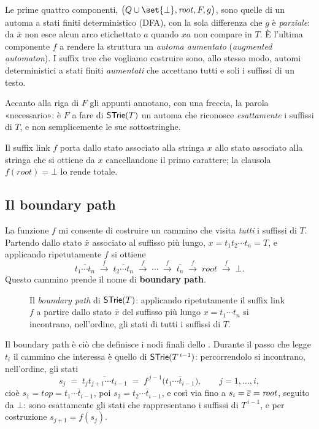 Le prime quattro componenti, $\bigl(Q\cup\set{\bot},\mathit{root},F,g\bigr)$, sono quelle di
un automa a stati finiti deterministico (DFA), con la sola differenza che $g$ è
\emph{parziale}: da $\bar{x}$ non esce alcun arco etichettato $a$ quando $xa$ non compare in
$T$. È l'ultima componente $f$ a rendere la struttura un \emph{automa aumentato}
(\emph{augmented automaton}). I suffix tree che
vogliamo costruire sono, allo stesso modo, automi deterministici a stati finiti
\emph{aumentati} che accettano tutti e soli i suffissi di un testo.

\begin{osservazione}
Accanto alla riga di $F$ gli appunti annotano, con una freccia, la parola «necessario»: è $F$
a fare di $\textsf{STrie}{}(T)$ un automa che riconosce \emph{esattamente} i suffissi di $T$, e non
semplicemente le sue sottostringhe.
\end{osservazione}

Il suffix link $f$ porta dallo stato associato alla stringa $x$ allo stato associato alla
stringa che si ottiene da $x$ cancellandone il primo carattere; la clausola
$f(\mathit{root}) = \bot$ lo rende totale.

\subsection{Il boundary path}

\begin{osservazione}
La funzione $f$ mi consente di costruire un cammino che visita \emph{tutti} i suffissi di
$T$. Partendo dallo stato $\bar{x}$ associato al suffisso più lungo, $x = t_1 t_2 \cdots t_n
= T$, e applicando ripetutamente $f$ si ottiene
\[
  \overline{t_1\cdots t_n}
  \;\xrightarrow{\ f\ }\; \overline{t_2\cdots t_n}
  \;\xrightarrow{\ f\ }\; \cdots
  \;\xrightarrow{\ f\ }\; \overline{t_n}
  \;\xrightarrow{\ f\ }\; \mathit{root}
  \;\xrightarrow{\ f\ }\; \bot .
\]
Questo cammino prende il nome di \textbf{boundary path}.
\end{osservazione}

\begin{figure}[H]
\centering

\caption{Il \emph{boundary path} di $\textsf{STrie}{}(T)$: applicando ripetutamente il suffix link $f$
a partire dallo stato $\bar{x}$ del suffisso più lungo $x = t_1\cdots t_n$ si incontrano,
nell'ordine, gli stati di tutti i suffissi di $T$.}
\label{fig:boundary-path}
\end{figure}

Il boundary path è ciò che definisce i nodi finali dello \STrie{}. Durante il passo che legge
$t_i$ il cammino che interessa è quello di $\textsf{STrie}{}(T^{\,i-1})$: percorrendolo si incontrano,
nell'ordine, gli stati
\[
  s_j \;=\; \overline{t_j t_{j+1} \cdots t_{i-1}}
        \;=\; f^{\,j-1}\bigl(\overline{t_1\cdots t_{i-1}}\bigr),
  \qquad j = 1,\dots,i,
\]
cioè $s_1 = \mathit{top} = \overline{t_1\cdots t_{i-1}}$, poi $s_2 = \overline{t_2\cdots
t_{i-1}}$, e così via fino a $s_i = \overline{\varepsilon} = \mathit{root}$, seguito da $\bot$:
sono esattamente gli stati che rappresentano i suffissi di $T^{\,i-1}$, e per costruzione
$s_{j+1} = f(s_j)$.


